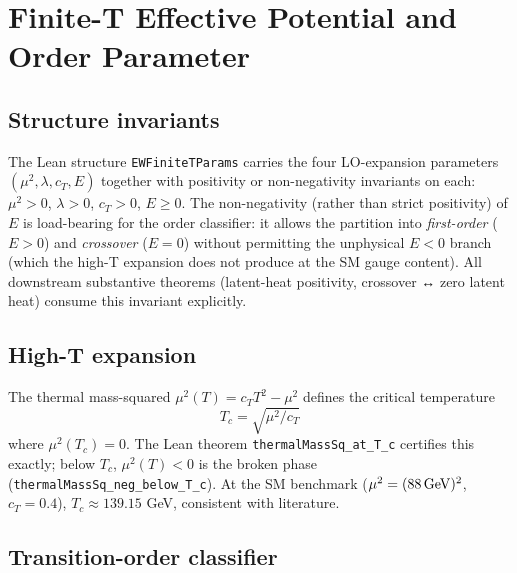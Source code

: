 \documentclass[aps,prd,twocolumn,showpacs,superscriptaddress,nofootinbib]{revtex4-2}
\newcommand{\CubicCoeff}{E}
\begin{document}
\section{Finite-T Effective Potential and Order Parameter}
\label{sec:finite-T-potential}

\subsection{Structure invariants}

The Lean structure \texttt{EWFiniteTParams} carries the four LO-expansion
parameters $(\mu^2, \lambda, c_T, \CubicCoeff)$ together with positivity
or non-negativity invariants on each:
$\mu^2 > 0$, $\lambda > 0$, $c_T > 0$, $\CubicCoeff \geq 0$. The
non-negativity (rather than strict positivity) of $\CubicCoeff$ is
load-bearing for the order classifier: it allows the partition into
\textit{first-order} ($\CubicCoeff > 0$) and \textit{crossover}
($\CubicCoeff = 0$) without permitting the unphysical $\CubicCoeff < 0$
branch (which the high-T expansion does not produce at the SM gauge
content). All downstream substantive theorems (latent-heat positivity,
crossover ↔ zero latent heat) consume this invariant explicitly.

\subsection{High-T expansion}

The thermal mass-squared $\mu^2(T) = c_T T^2 - \mu^2$ defines the
critical temperature
\begin{equation}
T_c = \sqrt{\mu^2 / c_T}
\end{equation}
where $\mu^2(T_c) = 0$. The Lean theorem
\texttt{thermalMassSq\_at\_T\_c} certifies this exactly; below $T_c$,
$\mu^2(T) < 0$ is the broken phase
(\texttt{thermalMassSq\_neg\_below\_T\_c}). At the SM benchmark
($\mu^2 = (88\,{\rm GeV})^2$, $c_T = 0.4$), $T_c \approx 139.15$ GeV,
consistent with literature.

\subsection{Transition-order classifier}
\end{document}
